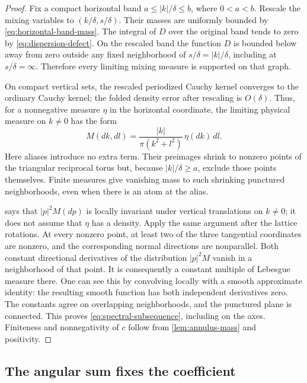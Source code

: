 \begin{proof}
Fix a compact horizontal band \(a\le|k|/\delta\le b\), where \(0<a<b\).
Rescale the mixing variables to \((k/\delta,s/\delta)\). Their masses are
uniformly bounded by \cref{eq:horizontal-band-mass}. The integral of \(D\)
over the original band tends to zero by \cref{eq:dispersion-defect}.
On the rescaled band the function \(D\) is bounded below away from zero
outside any fixed neighborhood of \(s/\delta=|k|/\delta\), including at
\(s/\delta=\infty\). Therefore every limiting mixing measure is supported
on that graph.

On compact vertical sets, the rescaled periodized Cauchy kernel converges to
the ordinary Cauchy kernel; the folded density error after rescaling is
\(O(\delta)\). Thus, for a nonnegative measure \(\eta\) in the horizontal
coordinate, the limiting physical measure on \(k\ne0\) has the form
\begin{equation}
 \label{eq:limiting-cauchy}
 M(dk,dl)=\frac{|k|}{\pi(k^2+l^2)}\,\eta(dk)\,dl.
\end{equation}
Here aliases introduce no extra term. Their preimages shrink to nonzero
points of the triangular reciprocal torus but, because \(|k|/\delta\ge a\),
exclude those points themselves. Finite measures give vanishing mass to such
shrinking punctured neighborhoods, even when there is an atom at the alias.

 says that \(|p|^2M(dp)\) is locally
invariant under vertical translations on \(k\ne0\); it does not assume that
\(\eta\) has a density. Apply the same argument after the lattice rotations.
At every nonzero point, at least two of the three tangential coordinates are
nonzero, and the corresponding normal directions are nonparallel. Both
constant directional derivatives of the distribution \(|p|^2M\) vanish in
a neighborhood of that point. It is consequently a constant multiple of
Lebesgue measure there. One can see this by convolving locally with a smooth
approximate identity: the resulting smooth function has both independent
derivatives zero. The constants agree on overlapping neighborhoods, and the
punctured plane is connected. This proves
\cref{eq:spectral-subsequence}, including on the axes. Finiteness and
nonnegativity of \(c\) follow from \cref{lem:annulus-mass} and positivity.
\end{proof}

\subsection{The angular sum fixes the coefficient}

